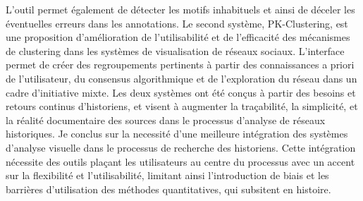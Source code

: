 {L’outil permet également de détecter les motifs inhabituels et ainsi de déceler les éventuelles erreurs dans les annotations.
Le second système, PK-Clustering, est une proposition d'amélioration de l'utilisabilité et de l'efficacité des mécanismes de clustering dans les systèmes de visualisation de réseaux sociaux.
L'interface permet de créer des regroupements pertinents à partir des connaissances a priori de l'utilisateur, du consensus algorithmique et de l'exploration du réseau dans un cadre d'initiative mixte.
Les deux systèmes ont été conçus à partir des besoins et retours continus d'historiens, et visent à augmenter la traçabilité, la simplicité, et la réalité documentaire des sources dans le processus d'analyse de réseaux historiques.
Je conclus sur la necessité d'une meilleure intégration des systèmes d'analyse visuelle dans le processus de recherche des historiens.
Cette intégration nécessite des outils plaçant les utilisateurs au centre du processus avec un accent sur la flexibilité et l'utilisabilité, limitant ainsi l'introduction de biais et les barrières d'utilisation des méthodes quantitatives, qui subsitent en histoire.}
